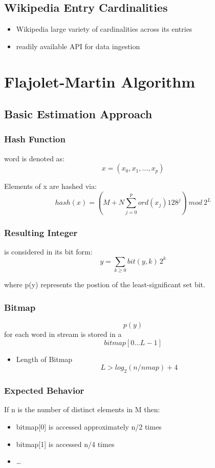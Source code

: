 \documentclass[11pt]{article}
\begin{document}
\subsection*{Wikipedia Entry Cardinalities}
\label{sec:orgf5d2bd2}
\begin{itemize}
\item Wikipedia large variety of cardinalities across its entries
\item readily available API for data ingestion
\end{itemize}

\section*{Flajolet-Martin Algorithm}
\label{sec:orgaddfa05}
\subsection*{Basic Estimation Approach}
\label{sec:org7773de8}
\subsubsection*{Hash Function}
\label{sec:org8ca99e8}
word is denoted as:
$$ x = (x_0, x_1, \dots, x_p) $$

Elements of x are hashed via:
$$ hash(x) = (M + N \sum\limits_{j = 0}^p ord(x_j) 128^j)\: mod \: 2^L $$
\subsubsection*{Resulting Integer}
\label{sec:org6e7c8db}
is considered in its bit form:
$$  y = \sum_{k \ge 0} bit(y, k)\,2^k $$

where p(y) represents the postion of the least-significant set bit.
\subsubsection*{Bitmap}
\label{sec:org870f388}
$$p(y)$$ for each word in stream is stored in a $$bitmap[0 \ldots L-1]$$
\begin{itemize}
\item Length of Bitmap $$L > log_2(n/nmap) + 4$$
\end{itemize}
\subsubsection*{Expected Behavior}
\label{sec:org269c977}
If n is the number of distinct elements in M then:
\begin{itemize}
\item bitmap[0] is accessed approximately n/2 times
\item bitmap[1] is accessed n/4 times
\item \ldots{}
\end{itemize}
\end{document}
